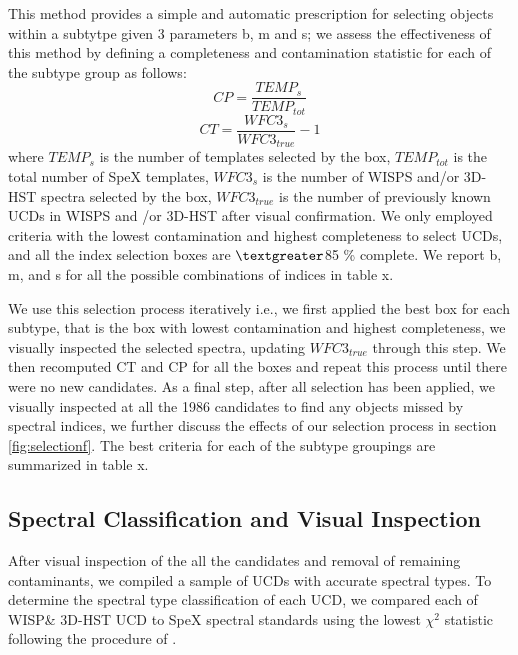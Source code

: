 \documentclass[manuscript]{aastex}
\begin{document}
This method provides a simple and automatic prescription for selecting objects  within a subtytpe given 3 parameters b, m and s; we assess the effectiveness of this method by defining a completeness and contamination statistic for each of the subtype group  as follows: 
 \begin{equation} CP=\frac{TEMP_s}{TEMP_{tot}} \end{equation}
\begin{equation} CT= \frac{WFC3_s}{WFC3_{true}} -1 \end{equation} where $TEMP_s$ is the number of templates selected by the box, $TEMP_{tot}$ is the total number of SpeX templates, $WFC3_s$ is the number of WISPS and/or 3D-HST spectra selected by the box, $WFC3_{true}$  is the number of previously known UCDs in WISPS and /or 3D-HST after visual confirmation. We only employed criteria with the lowest contamination and highest completeness to select UCDs, and all the index selection boxes are $\textgreater $85 \% complete.  We report b, m, and s for all the possible combinations of indices in table x.

We use this selection process iteratively i.e., we first applied the best box for each subtype, that is the box with lowest contamination and highest completeness, we visually inspected the selected spectra, updating $WFC3_{true}$ through this step. We then recomputed CT and CP for all the boxes and repeat this process until there were no new candidates. As a final step, after all selection has been applied, we visually inspected at all the 1986 candidates to find any objects missed by spectral indices, we further discuss the effects of our selection process in section \ref{fig:selectionf}. The best criteria for each of the subtype groupings are summarized in table x.

\subsection{Spectral Classification and Visual Inspection} \label{visual}

After visual inspection of the all the candidates and removal of remaining contaminants, we compiled a sample of UCDs with accurate spectral types. To determine the spectral type classification of each UCD, we compared each of WISP\& 3D-HST UCD to SpeX spectral standards using the lowest $\chi^2$ statistic following the procedure of \cite{2010ApJS..190..100K}. 
\end{document}
